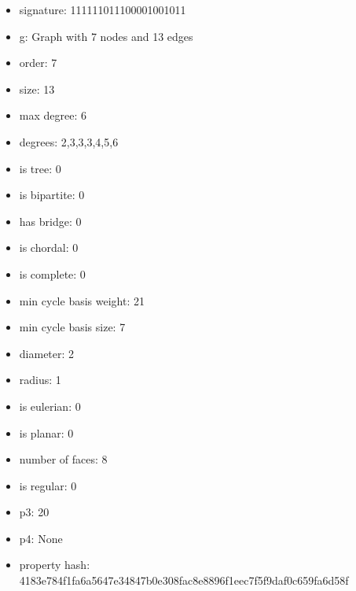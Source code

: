 \begin{itemize}
\item signature: 111111011100001001011
\item g: Graph with 7 nodes and 13 edges
\item order: 7
\item size: 13
\item max degree: 6
\item degrees: 2,3,3,3,4,5,6
\item is tree: 0
\item is bipartite: 0
\item has bridge: 0
\item is chordal: 0
\item is complete: 0
\item min cycle basis weight: 21
\item min cycle basis size: 7
\item diameter: 2
\item radius: 1
\item is eulerian: 0
\item is planar: 0
\item number of faces: 8
\item is regular: 0
\item p3: 20
\item p4: None
\item property hash: 4183e784f1fa6a5647e34847b0e308fac8e8896f1eec7f5f9daf0c659fa6d58f
\end{itemize}
\newpage
\begin{figure}
\end{figure}
